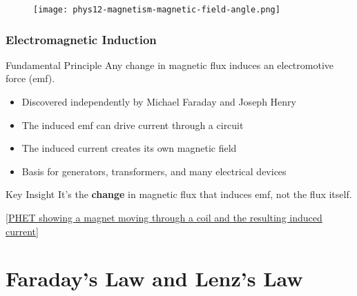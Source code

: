\documentclass{beamer}
\begin{document}
\begin{frame}
\begin{figure}
    \centering
    \texttt{[image: phys12-magnetism-magnetic-field-angle.png]}
\end{figure}

\end{frame}

\begin{frame}
\frametitle{Electromagnetic Induction}
\begin{block}{Fundamental Principle}
Any change in magnetic flux induces an electromotive force (emf).
\end{block}

\begin{itemize}
\item Discovered independently by Michael Faraday and Joseph Henry
\item The induced emf can drive current through a circuit
\item The induced current creates its own magnetic field
\item Basis for generators, transformers, and many electrical devices
\end{itemize}

\begin{alertblock}{Key Insight}
It's the \textbf{change} in magnetic flux that induces emf, not the flux itself.
\end{alertblock}

\alert{[\href{https://phet.colorado.edu/en/simulations/faraday}{PHET showing a magnet moving through a coil and the resulting induced current}]}
\end{frame}

\section{Faraday's Law and Lenz's Law}
\end{document}
